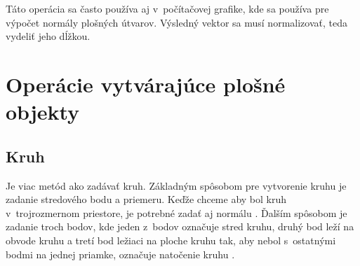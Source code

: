 Táto operácia sa často používa aj v~počítačovej grafike, kde sa používa pre výpočet normály plošných útvarov. Výsledný vektor sa musí normalizovať, teda vydeliť jeho dĺžkou.









\section{Operácie vytvárajúce plošné objekty}


\subsection*{Kruh}
Je viac metód ako zadávať kruh. Základným spôsobom pre vytvorenie kruhu je zadanie stredového bodu a priemeru. Keďže chceme aby bol kruh v~trojrozmernom priestore, je potrebné zadať aj normálu .
Ďalším spôsobom je zadanie troch bodov, kde jeden z~bodov označuje stred kruhu, druhý bod leží na obvode kruhu a tretí bod ležiaci na ploche kruhu tak, aby nebol s~ostatnými bodmi na jednej priamke, označuje natočenie kruhu \cite{modernipocitacovagrafika}.

